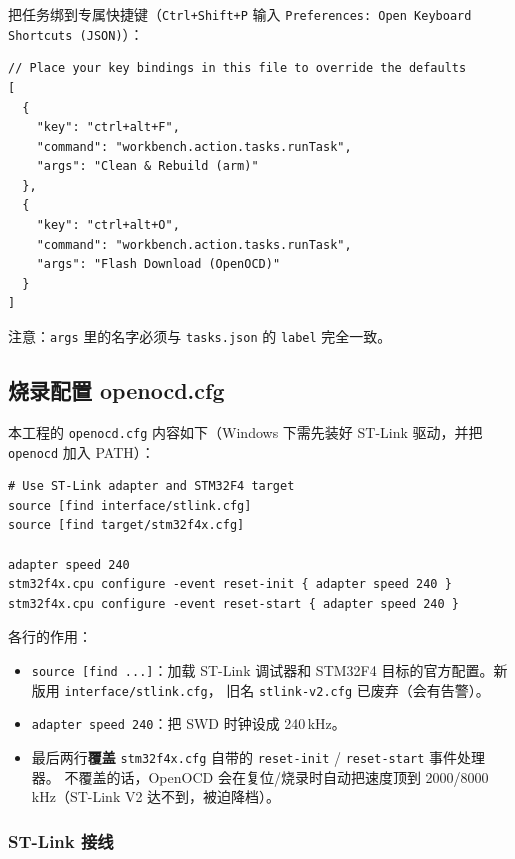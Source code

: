 把任务绑到专属快捷键（\texttt{Ctrl+Shift+P} 输入
\texttt{Preferences: Open Keyboard Shortcuts (JSON)}）：

\begin{lstlisting}[style=generic]
// Place your key bindings in this file to override the defaults
[
  {
    "key": "ctrl+alt+F",
    "command": "workbench.action.tasks.runTask",
    "args": "Clean & Rebuild (arm)"
  },
  {
    "key": "ctrl+alt+O",
    "command": "workbench.action.tasks.runTask",
    "args": "Flash Download (OpenOCD)"
  }
]
\end{lstlisting}

注意：\texttt{args} 里的名字必须与 \texttt{tasks.json} 的
\texttt{label} 完全一致。

\subsection{烧录配置 openocd.cfg}

本工程的 \texttt{openocd.cfg} 内容如下（Windows 下需先装好
ST-Link 驱动，并把 \texttt{openocd} 加入 PATH）：

\begin{lstlisting}[style=generic]
# Use ST-Link adapter and STM32F4 target
source [find interface/stlink.cfg]
source [find target/stm32f4x.cfg]

adapter speed 240
stm32f4x.cpu configure -event reset-init { adapter speed 240 }
stm32f4x.cpu configure -event reset-start { adapter speed 240 }
\end{lstlisting}

各行的作用：

\begin{itemize}
  \item \texttt{source [find ...]}：加载 ST-Link 调试器和 STM32F4
        目标的官方配置。新版用 \texttt{interface/stlink.cfg}，
        旧名 \texttt{stlink-v2.cfg} 已废弃（会有告警）。
  \item \texttt{adapter speed 240}：把 SWD 时钟设成 240\,kHz。
  \item 最后两行\textbf{覆盖} \texttt{stm32f4x.cfg} 自带的
        \texttt{reset-init} / \texttt{reset-start} 事件处理器。
        不覆盖的话，OpenOCD 会在复位/烧录时自动把速度顶到
        2000/8000\,kHz（ST-Link V2 达不到，被迫降档）。
\end{itemize}

\subsubsection{ST-Link 接线}

